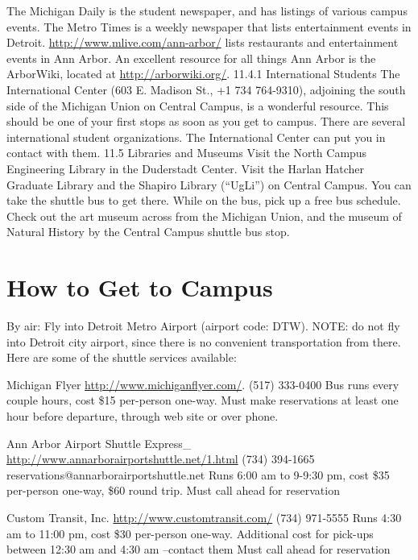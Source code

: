 \documentclass[11pt]{article}
\begin{document}
The Michigan Daily is the student newspaper, and has listings of various campus events.
The Metro Times is a weekly newspaper that lists entertainment events in Detroit.
\href{http://www.mlive.com/ann-arbor/}{http://www.mlive.com/ann-arbor/} lists restaurants and entertainment events in Ann Arbor.
An excellent resource for all things Ann Arbor is the ArborWiki, located at \href{http://arborwiki.org/}{http://arborwiki.org/}.
11.4.1  International Students
The International Center (603 E. Madison St., +1 734 764-9310), adjoining the south side of the Michigan Union on Central Campus, is a wonderful resource.  This should be one of your first stops as soon as you get to campus. There are several international student organizations.  The International Center can put you in contact with them.
11.5 Libraries and Museums
Visit the North Campus Engineering Library in the Duderstadt Center.
Visit the Harlan Hatcher Graduate Library and the Shapiro Library (“UgLi”) on Central Campus.  You can take the shuttle bus to get there.  While on the bus, pick up a free bus schedule.
Check out the art museum across from the Michigan Union, and the museum of Natural History by the Central Campus shuttle bus stop.
\section{How to Get to Campus}
\label{sec-13}

By air:
Fly into Detroit Metro Airport (airport code: DTW).  NOTE:  do not fly into Detroit city airport, since there is no convenient transportation from there.  Here are some of the shuttle services available:

Michigan Flyer
\href{http://www.michiganflyer.com/}{http://www.michiganflyer.com/}.
(517) 333-0400
Bus runs every couple hours, cost \$15 per-person one-way.
Must make reservations at least one hour before departure, through web site or over phone.


Ann Arbor Airport Shuttle Express\_{}
\href{http://www.annarborairportshuttle.net/1.html}{http://www.annarborairportshuttle.net/1.html}
(734) 394-1665
reservations@annarborairportshuttle.net
Runs 6:00 am to 9-9:30 pm, cost \$35 per-person one-way, \$60 round trip.
Must call ahead for reservation


Custom Transit, Inc.
\href{http://www.customtransit.com/}{http://www.customtransit.com/}
(734) 971-5555
Runs 4:30 am to 11:00 pm, cost \$30 per-person one-way.
Additional cost for pick-ups between 12:30 am and 4:30 am –contact them
Must call ahead for reservation
\end{document}
